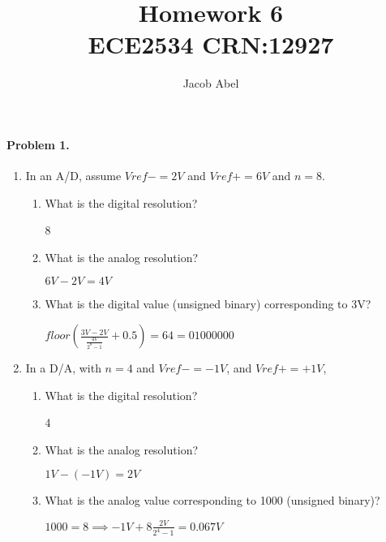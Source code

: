 \documentclass[12pt,letterpaper,titlepage]{article}
\author{Jacob Abel}
\title{	Homework 6
	\\\large ECE2534 CRN:12927
}
\begin{document}
\maketitle

\begin{raggedright}

\paragraph{Problem 1. }
\begin{enumerate}
\item In an A/D, assume $Vref- = 2V$ and $Vref+ = 6V$ and $n = 8$.
\begin{enumerate}[label=\alph*.]
\item What is the digital resolution? 

8
\item What is the analog resolution? 

$6V-2V=4V$
\item What is the digital value (unsigned binary) corresponding to 3V?

$floor(\frac{3V-2V}{\frac{4V}{2^8-1}}+0.5)=64=01000000$
\end{enumerate}

\item In a D/A, with $n = 4$ and $Vref- = -1V$, and $Vref+ = +1V$,
\begin{enumerate}[label=\alph*.]
\item What is the digital resolution? 

4
\item What is the analog resolution? 

$1V-(-1V)=2V$
\item What is the analog value corresponding to 1000 (unsigned binary)?

$1000=8\implies -1V  + 8 \frac{2V}{2^4-1} = 0.067V$
\end{enumerate}
\end{enumerate}

\clearpage

\end{raggedright}
\end{document}
